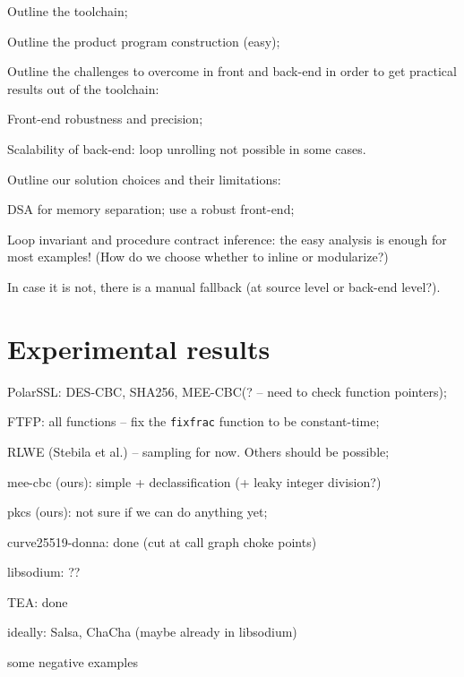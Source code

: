 \documentclass[letterpaper,10pt]{IEEEtran} %
\begin{document}
\begin{compactitem}
\item Outline the toolchain;
\item Outline the product program construction (easy);
\item Outline the challenges to overcome in front and back-end in
  order to get practical results out of the toolchain:
  \begin{compactitem}
  \item Front-end robustness and precision;
  \item Scalability of back-end: loop unrolling not possible in some
    cases.
  \end{compactitem}
\item Outline our solution choices and their limitations:
  \begin{compactitem}
  \item DSA for memory separation; use a robust front-end;
  \item Loop invariant and procedure contract inference: the easy
    analysis is enough for most examples! (How do we choose whether to
    inline or modularize?)
  \item In case it is not, there is a manual fallback (at source level
    or back-end level?).
  \end{compactitem}
\end{compactitem}

\section{Experimental results}

\begin{compactitem}
\item PolarSSL: DES-CBC, SHA256, MEE-CBC(? -- need to check function pointers);
\item FTFP: all functions -- fix the \texttt{fixfrac} function to be
  constant-time;
\item RLWE (Stebila et al.) -- sampling for now. Others should be
  possible;
\item mee-cbc (ours): simple + declassification (+ leaky integer division?)
\item pkcs (ours): not sure if we can do anything yet;
\item curve25519-donna: done (cut at call graph choke points)
\item libsodium: ??
\item TEA: done
\item ideally: Salsa, ChaCha (maybe already in libsodium)
\item some negative examples
\end{compactitem}
\end{document}
